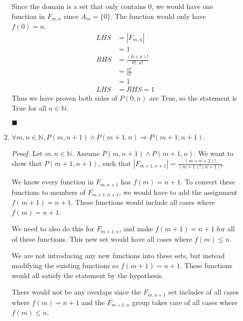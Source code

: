 \documentclass{article}
\newcommand\qedsymbol{\hfill$\blacksquare$}
\begin{document}
\begin{enumerate}[label = (\alph*)]
\begin{enumerate}[label = (\roman*)]
                Since the domain is a set that only contains 0, we would have 
                one function in $F_ {m, n}$ since $A_m = \{0\}$. The function 
                would only have $f (0) = n$.
                \begin{align*} 
                    LHS &= |F_ {m, n}| \\
                        &= 1 \\
                    RHS &= \frac{ (0 + n)!}{0! \cdot n!} \\
                        &= \frac{n!}{n!} \\
                        &= 1 \\
                    LHS &= RHS = 1
                \end{align*}
                Thus we have proven both sides of $P (0, n)$ are True, 
                so the statement is True for all $n \in \mathbb{N}$.

                \qedsymbol
                \newpage
            \item $\forall m, n \in \mathbb{N}, P (m, n+1) \land 
                P (m + 1, n) \Rightarrow P (m + 1, n + 1)$.

                \textit{Proof.} Let $m , n \in \mathbb{N}$. Assume 
                $P ( m , n + 1) \land P(m+1, n)$. We want to show that 
            $P (m +1, n+1)$, such that $| F_ {m + 1, n + 1}| = 
            \frac{ (m + n + 2)!}{ (m + 1)! (n + 1)!}$. 

                We know every function in $F_ {m , n +1}$ has $f (m) = n + 1$. 
                To convert these functions to members of $F_ {m + 1, n + 1}$, 
                we would have to add the assignment $f ( m + 1) = n + 1$. These 
                functions would include all cases where $f (m) = n + 1$. 
                
                We need to also do this for $F_ {m + 1, n}$, 
                and make $f (m + 1) = n +1$ for all of these functions. This new 
                set would have all cases where $f ( m) \leq n$.

                We are not introducing any new functions into these sets, 
                but instead modifying the existing functions so $f (m + 1) 
                = n+1$. These functions would all satisfy the statement 
                by the hypothesis.

                There would not 
                be any overlaps since the $F_ {m, n+1}$ set includes of all 
                cases where $f (m )= n + 1$ and the $F_ {m+1, n}$ group takes care 
                of all cases where $ f (m) \leq n$. 


\end{enumerate}
\end{enumerate}
\end{document}
